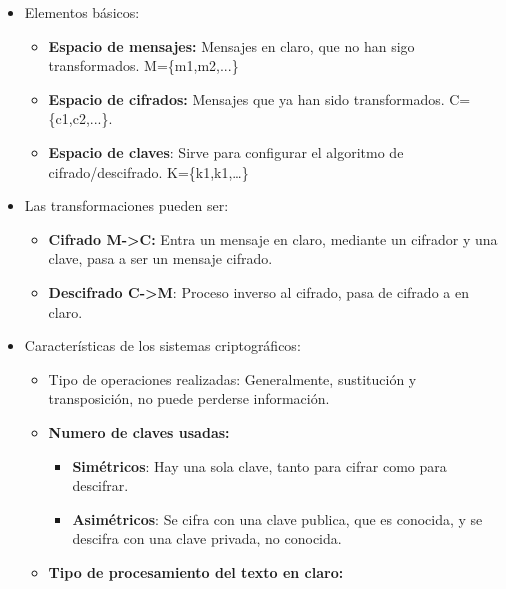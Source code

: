 \documentclass[12pt, twoside, openright]{report} %
\begin{document}
  \begin{itemize}
  \item Elementos básicos:
    
    \begin{itemize}
    \item \textbf{Espacio de mensajes:} Mensajes en claro, que no han sigo
      transformados. M=\{m1,m2,...\}
      
    \item \textbf{Espacio de cifrados:} Mensajes que ya han sido
      transformados. C=\{c1,c2,...\}.
      
    \item \textbf{Espacio de claves}: Sirve para configurar el algoritmo de
      cifrado/descifrado. K=\{k1,k1,\ldots\}
      
    \end{itemize}
  \item Las transformaciones pueden ser:
        \begin{itemize}
    \item \textbf{Cifrado M-\textgreater C:} Entra un mensaje en claro,
      mediante un cifrador y una clave, pasa a ser un mensaje cifrado.
      
    \item \textbf{Descifrado C-\textgreater M}: Proceso inverso al cifrado,
      pasa de cifrado a en claro.
      
    \end{itemize}
  \item Características de los sistemas criptográficos:
        \begin{itemize}
    \item Tipo de operaciones realizadas: Generalmente, sustitución y
      transposición, no puede perderse información.
      
    \item \textbf{Numero de claves usadas:}
      
      \begin{itemize}
      \item \textbf{Simétricos}: Hay una sola clave, tanto para cifrar como
        para descifrar.
        
      \item \textbf{Asimétricos}: Se cifra con una clave publica, que es
        conocida, y se descifra con una clave privada, no conocida.
        
      \end{itemize}
    \item \textbf{Tipo de procesamiento del texto en claro:}
      

\end{itemize}
\end{itemize}
\end{document}

